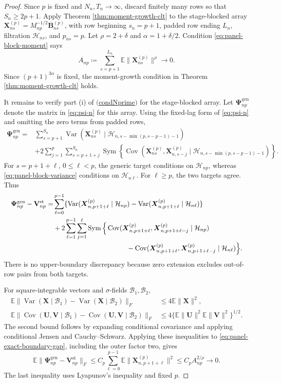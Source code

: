 \documentclass[11pt]{article}
\renewcommand\vec[1]{\boldsymbol{#1}}
\newcommand\mat[1]{\mathbf{#1}}
\DeclareMathOperator{\Cov}{Cov}
\DeclareMathOperator{\Var}{Var}
\DeclareMathOperator{\Sym}{Sym}
\newcommand{\E}{\mathbb{E}}
\newcommand{\Hcal}{\mathcal{H}}
\newcommand{\B}{\mathcal{B}}
\newcommand{\refitem}[1]{$\mathrm{(}$\hyperlink{cond:#1}{\csname cond#1\endcsname}$\mathrm{)}$}
\theoremstyle{definition}
\begin{document}
\begin{proof}
Since \(p\) is fixed and \(N_n,T_n\to\infty\), discard finitely many rows so that \(S_n\geq2p+1\).
Apply Theorem \ref{thm:moment-growth-clt} to the stage-blocked array \(\vec X^{(p)}_{ns}=M_{np}^{-1/2}\vec B^{(p)}_{ns}\), with row beginning \(s_n=p+1\), padded row ending \(L_n\), filtration \(\Hcal_{ns}\), and \(p_{ns}=p\).
Let \(\rho=2+\delta\) and \(\alpha=1+\delta/2\).
Condition \eqref{eq:panel-block-moment} says
\[
A_{np}
\coloneqq
\sum_{s=p+1}^{L_n}\E\|\vec X^{(p)}_{ns}\|^\rho
\longrightarrow0.
\]
Since \((p+1)^{3\alpha}\) is fixed, the moment-growth condition in Theorem \ref{thm:moment-growth-clt} holds.

It remains to verify part (i) of \refitem{Nprime} for the stage-blocked array.
Let \(\mat{\Psi}_{np}^{\mathrm{gen}}\) denote the matrix in \eqref{eq:psi-n} for this array.
Using the fixed-lag form of \eqref{eq:psi-n} and omitting the zero terms from padded rows,
\begin{align*}
\mat{\Psi}_{np}^{\mathrm{gen}}
=&
\sum_{s=p+1}^{S_n}
\Var(\vec X^{(p)}_{ns}
\mid\Hcal_{n,s-\min(p,s-p-1)-1})\\
&+
2\sum_{j=1}^{p}\sum_{s=p+1+j}^{S_n}
\Sym\!\left\{
\Cov(\vec X^{(p)}_{ns},\vec X^{(p)}_{n,s-j}
\mid\Hcal_{n,s-\min(p,s-p-1)-1})
\right\}.
\end{align*}
For \(s=p+1+\ell\), \(0\leq\ell<p\), the generic target conditions on \(\Hcal_{np}\), whereas \eqref{eq:panel-block-variance} conditions on \(\Hcal_{n\ell}\).
For \(\ell\geq p\), the two targets agree.
Thus
\begin{align}
\mat{\Psi}_{np}^{\mathrm{gen}}-\mat V_{np}^{\mathrm{st}}
=&
\sum_{\ell=0}^{p-1}
\{\Var(\vec X^{(p)}_{n,p+1+\ell}\mid\Hcal_{np})
-\Var(\vec X^{(p)}_{n,p+1+\ell}\mid\Hcal_{n\ell})\}
\nonumber\\
&+
2\sum_{\ell=1}^{p-1}\sum_{j=1}^{\ell}
\Sym\Big\{
\Cov(\vec X^{(p)}_{n,p+1+\ell},
\vec X^{(p)}_{n,p+1+\ell-j}\mid\Hcal_{np})
\nonumber\\
&\hspace{38mm}
-\Cov(\vec X^{(p)}_{n,p+1+\ell},
\vec X^{(p)}_{n,p+1+\ell-j}\mid\Hcal_{n\ell})
\Big\}.
\label{eq:panel-exact-boundary-gap}
\end{align}
There is no upper-boundary discrepancy because zero extension excludes out-of-row pairs from both targets.

For square-integrable vectors and \(\sigma\)-fields \(\B_1,\B_2\),
\begin{align*}
\E\|\Var(\vec X\mid\B_1)-\Var(\vec X\mid\B_2)\|_F
&\leq4\E\|\vec X\|^2,\\
\E\|\Cov(\vec U,\vec V\mid\B_1)
-\Cov(\vec U,\vec V\mid\B_2)\|_F
&\leq
4\{\E\|\vec U\|^2\E\|\vec V\|^2\}^{1/2}.
\end{align*}
The second bound follows by expanding conditional covariance and applying conditional Jensen and Cauchy--Schwarz.
Applying these inequalities to \eqref{eq:panel-exact-boundary-gap}, including the outer factor two, gives
\[
\E\|\mat{\Psi}_{np}^{\mathrm{gen}}-\mat V_{np}^{\mathrm{st}}\|_F
\leq
C_p\sum_{\ell=0}^{p-1}\E\|\vec X^{(p)}_{n,p+1+\ell}\|^2
\leq
C_p A_{np}^{2/\rho}
\longrightarrow0.
\]
The last inequality uses Lyapunov's inequality and fixed \(p\).


\end{proof}
\end{document}
